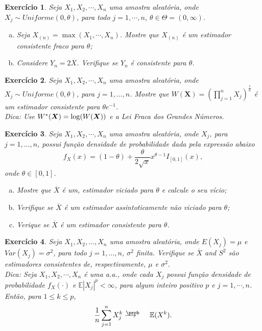 \documentclass[letter,11pt]{article}
\newtheorem{exer}{Exercício}
\newcommand{\E}{\mathbb{E}}
\newcommand{\mat}[1]{\mbox{\boldmath{$#1$}}}
\begin{document}
\begin{exer} \rm
Seja $X_1,X_2,\cdots,X_n$ uma amostra aleatória, onde $X_j\sim Uniforme(0,\theta)$, para todo $j=1,\cdots,n$, $\theta \in \Theta=(0,\infty)$.  %
\begin{enumerate}[a)]
  \item Seja $X_{(n)} = \max(X_1,\cdots,X_n)$. Mostre que $X_{(n)}$ é um estimador consistente fraco para $\theta$;
  \item Considere $Y_n=2\overline{X}$. Verifique se $Y_n$ é consistente para $\theta$.
\end{enumerate}
\end{exer}

\begin{exer} \rm
Seja $X_1,X_2,\cdots,X_n$ uma amostra aleatória, onde $X_j\sim Uniforme(0,\theta)$, para $j=1, \ldots, n$. Mostre que $W(\boldsymbol{X}) = \left(\prod_{j=1}^{n}X_j\right)^\frac{1}{n}$ é um estimador consistente para $\theta e^{-1}$. \\
\noindent Dica: Use $W^\ast(\mat{X})=\log(W(\mat{X}))$ e a Lei Fraca dos Grandes Números. %
\end{exer}


\begin{exer} \rm
Seja $X_1,X_2,\cdots,X_n$ uma amostra aleatória, onde $X_j$, para $j=1, \ldots, n$, possui função densidade de probabilidade dada pela expressão abaixo
$$f_{X}(x)=(1-\theta)+\frac{\theta}{2\sqrt{x }}x^{\theta-1}I_{[0,1]}(x),$$
\noindent onde $\theta\in[0,1]$.
\begin{enumerate}[a)]
\item Mostre que $\overline{X}$ é um, estimador viciado para $\theta$ e calcule o seu vício;
\item Verifique se $\overline{X}$ é um estimador assintoticamente não viciado para $\theta$;
\item Verique se $\overline{X}$ é um estimador consistente para $\theta$.
\end{enumerate}
\end{exer}


\begin{exer} \rm
Seja $X_1, X_2, \ldots, X_n$ uma amostra aleatória, onde $E(X_j) = \mu$ e $Var(X_j) = \sigma^2$, para todo $j=1, \ldots, n$, $\sigma^2$ finita. Verifique se  $\overline{X}$ and $S^2$ são estimadores consistentes de, respectivamente, $\mu$ e $\sigma^2$. \\
\noindent Dica: Seja $X_1,X_2,\cdots,X_n$ é uma a.a., onde cada $X_j$ possui função densidade de probabilidade $f_X(\cdot)$  e $\E|X_j|^p<\infty$, para algum inteiro positivo $p$ e $j=1,\cdots,n$. Então, para $1\leqslant k\leqslant p$,
$$\frac{1}{n}\sum_{j=1}^{n}X_j^k\longrightarrow^{\hspace{-.5cm}\prob}\hspace{.4cm} \E(X^k).$$
\end{exer}
\end{document}
